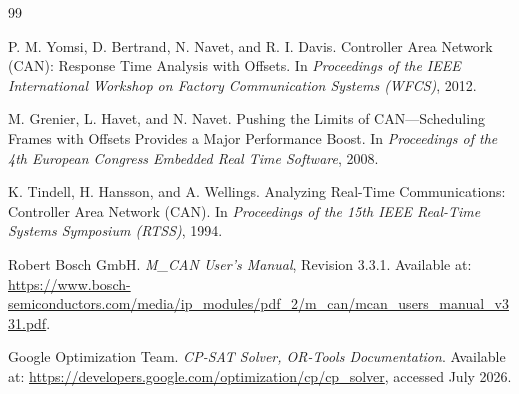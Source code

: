 \documentclass[UTF8,12pt,a4paper]{ctexart}
\begin{document}
\begin{thebibliography}{99}

P. M. Yomsi, D. Bertrand, N. Navet, and R. I. Davis.
Controller Area Network (CAN): Response Time Analysis with Offsets.
In \emph{Proceedings of the IEEE International Workshop on Factory Communication Systems (WFCS)}, 2012.

M. Grenier, L. Havet, and N. Navet.
Pushing the Limits of CAN---Scheduling Frames with Offsets Provides a Major Performance Boost.
In \emph{Proceedings of the 4th European Congress Embedded Real Time Software}, 2008.

K. Tindell, H. Hansson, and A. Wellings.
Analyzing Real-Time Communications: Controller Area Network (CAN).
In \emph{Proceedings of the 15th IEEE Real-Time Systems Symposium (RTSS)}, 1994.

Robert Bosch GmbH.
\emph{M\_CAN User's Manual}, Revision 3.3.1.
Available at: \url{https://www.bosch-semiconductors.com/media/ip_modules/pdf_2/m_can/mcan_users_manual_v331.pdf}.

Google Optimization Team.
\emph{CP-SAT Solver, OR-Tools Documentation}.
Available at: \url{https://developers.google.com/optimization/cp/cp_solver}, accessed July 2026.

\end{thebibliography}
\end{document}

